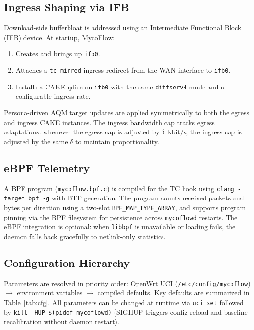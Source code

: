\documentclass[conference]{IEEEtran}
\begin{document}
\subsection{Ingress Shaping via IFB}

Download-side bufferbloat is addressed using an Intermediate Functional Block
(IFB) device.
At startup, MycoFlow:
\begin{enumerate}
  \item Creates and brings up \texttt{ifb0}.
  \item Attaches a \texttt{tc mirred} ingress redirect from the WAN
    interface to \texttt{ifb0}.
  \item Installs a CAKE qdisc on \texttt{ifb0} with the same
    \texttt{diffserv4} mode and a configurable ingress rate.
\end{enumerate}
Persona-driven AQM target updates are applied symmetrically to both the
egress and ingress CAKE instances.
The ingress bandwidth cap tracks egress adaptations: whenever the egress
cap is adjusted by $\delta$~kbit/s, the ingress cap is adjusted by the same
$\delta$ to maintain proportionality.

\subsection{eBPF Telemetry}

A BPF program (\texttt{mycoflow.bpf.c}) is compiled for the TC hook
using \texttt{clang -target bpf -g} with BTF generation.
The program counts received packets and bytes per direction using a two-slot
\texttt{BPF\_MAP\_TYPE\_ARRAY}, and supports program pinning via the BPF
filesystem for persistence across \texttt{mycoflowd} restarts.
The eBPF integration is optional: when \texttt{libbpf} is unavailable
or loading fails, the daemon falls back gracefully to netlink-only statistics.

\subsection{Configuration Hierarchy}

Parameters are resolved in priority order:
OpenWrt UCI (\texttt{/etc/config/mycoflow}) $\to$
environment variables $\to$
compiled defaults.
Key defaults are summarized in Table~\ref{tab:cfg}.
All parameters can be changed at runtime via \texttt{uci~set} followed by
\texttt{kill~-HUP \$(pidof mycoflowd)} (SIGHUP triggers config reload and
baseline recalibration without daemon restart).
\end{document}
